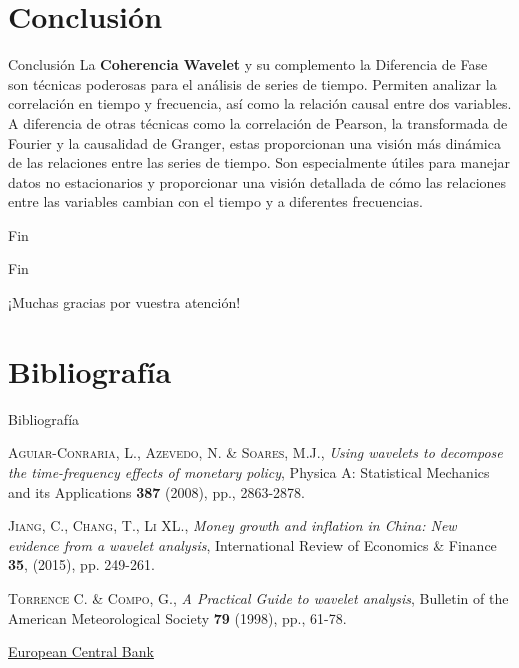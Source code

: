 \documentclass[11pt]{beamer}
\begin{document}
    \section{Conclusión}
    \begin{frame}{Conclusión}
	La \textbf{Coherencia Wavelet} y su complemento la Diferencia de Fase son técnicas poderosas para el análisis de series de tiempo. Permiten analizar la correlación en tiempo y frecuencia, así como la relación causal entre dos variables. A diferencia de otras técnicas como la correlación de Pearson, la transformada de Fourier y la causalidad de Granger, estas proporcionan una visión más dinámica de las relaciones entre las series de tiempo. Son especialmente útiles para manejar datos no estacionarios y proporcionar una visión detallada de cómo las relaciones entre las variables cambian con el tiempo y a diferentes frecuencias.
    \end{frame}

    \begin{frame}{Fin}
    \begin{center}
        {\huge Fin}
        
        \vspace{5mm}
        {\large ¡Muchas gracias por vuestra atención!}
    \end{center}
    \end{frame}

    \section{Bibliografía}
    \begin{frame}{Bibliografía}
        \begin{thebibliography}{99}


    \textsc{Aguiar-Conraria, L., Azevedo, N. \& Soares, M.J.}, \textit{Using wavelets to decompose the time-frequency effects of monetary policy}, Physica A: Statistical Mechanics and its Applications {\bf 387}  (2008), pp., 2863-2878.  
    
    \textsc{Jiang, C., Chang, T., Li XL.}, \textit{Money growth and inflation in China: New evidence from a wavelet analysis}, International Review of Economics \& Finance {\bf 35}, (2015), pp. 249-261. 

    \textsc{Torrence C. \& Compo, G.}, \textit{A Practical Guide to wavelet analysis}, Bulletin of the American Meteorological Society {\bf 79}  (1998), pp., 61-78.  

    \href{https://data.ecb.europa.eu/data}{European Central Bank}

\end{thebibliography}
    \end{frame}
	
\end{document}
